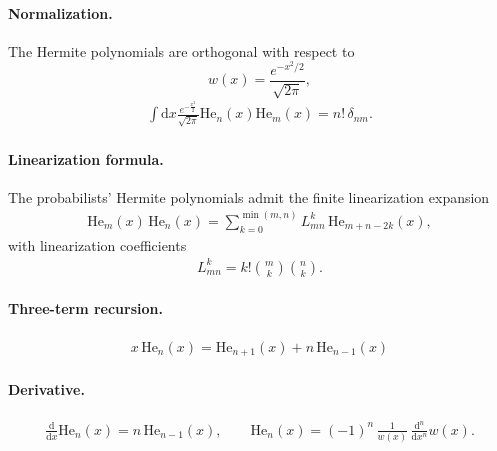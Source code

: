 \documentclass[a4paper,11pt]{article}
\numberwithin{equation}{section}
\theoremstyle{plain}
\theoremstyle{definition}
\theoremstyle{remark}
\newcommand{\1}{\ensuremath{\mathds{1}}\xspace}
\newcommand{\dd}{\ensuremath{{\textrm{d}}}\xspace}
\begin{document}
\paragraph{Normalization.}
The Hermite polynomials are orthogonal with respect to
\[
w(x)=\frac{e^{-x^2/2}}{\sqrt{2\pi}},
\]
\begin{align}
    \int \dd x\frac{e^{-\frac{x^2}{2}}}{\sqrt{2\pi}}\mathrm{He}_n(x)\mathrm{He}_m(x)=n!\,\delta_{nm}.\label{eq:Hermite-norm}
\end{align}
\paragraph{Linearization formula.}
The probabilists' Hermite polynomials admit the finite linearization expansion
\begin{align}
\mathrm{He}_m(x)\,\mathrm{He}_n(x)=\sum_{k=0}^{\min(m,n)} L^{k}_{mn}\,\mathrm{He}_{m+n-2k}(x),
\end{align}
with linearization coefficients
\begin{align}
L^{k}_{mn}=k!\binom{m}{k}\binom{n}{k}.
\end{align}
\paragraph{Three-term recursion.}
\begin{align}
    x\,\mathrm{He}_n(x)=\mathrm{He}_{n+1}(x)+n\,\mathrm{He}_{n-1}(x)\label{eq:hermite-3term}
\end{align}
\paragraph{Derivative.}
\begin{align}
\frac{\dd}{\dd x}\mathrm{He}_n(x)=n\,\mathrm{He}_{n-1}(x),
\qquad
\mathrm{He}_n(x)=(-1)^n\,\frac{1}{w(x)}\,\frac{\dd^n}{\dd x^n}w(x).
\label{eq:hermite-derivative}
\end{align}
\end{document}
